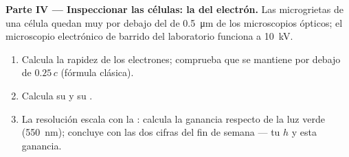 \begin{problem}
\medskip
\noindent\textbf{Parte IV --- Inspeccionar las células: la  del electrón.}
Las microgrietas de una célula quedan muy por debajo del  de \qty{0.5}{\micro m}
de los microscopios ópticos; el microscopio electrónico de barrido del laboratorio
funciona a \qty{10}{kV}.
\begin{enumerate}[resume]
  \item Calcula la rapidez de los electrones; comprueba que se mantiene por debajo de
        $0.25\,c$ (fórmula clásica).
  \item Calcula su  y su .
  \item La resolución escala con la : calcula la ganancia respecto de
        la luz verde (\qty{550}{nm}); concluye con las dos cifras del fin de semana ---
        tu $h$ y esta ganancia.
\end{enumerate}
\end{problem}
